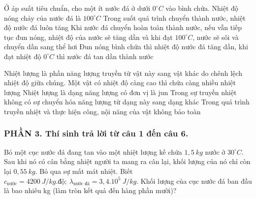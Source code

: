 \begin{ex}%
Ở áp suất tiêu chuẩn, cho một ít nước đá ở dưới $0^\circ C$ vào bình chứa.
\choiceTFt
{Nhiệt độ nóng chảy của nước đá là $100^\circ C$}
{Trong suốt quá trình chuyển thành nước, nhiệt độ nước đá luôn tăng}
{\True Khi nước đá chuyển hoàn toàn thành nước, nếu vẫn tiếp tục đun nóng, nhiệt
độ của nước sẽ tăng dần và khi đạt $100^\circ C$, nước sẽ sôi và chuyển dần sang thể hơi}
{\True Đun nóng bình chứa thì nhiệt độ nước đá tăng dần, khi đạt nhiệt độ $0^\circ C$ thì nước đá tan dần thành nước}
\loigiai{}
\end{ex}

\begin{ex}%
\loigiai{}
\end{ex}

\begin{ex}%
Nhiệt lượng là phần năng lượng truyền từ vật này sang vật khác do chênh lệch nhiệt độ giữa chúng.
\choiceTFt
{Một vật có nhiệt độ càng cao thì chứa càng nhiều nhiệt lượng}
{Nhiệt lượng là dạng năng lượng có đơn vị là jun}
{\True Trong sự truyền nhiệt không có sự chuyển hóa năng lượng từ dạng này sang dạng khác}
{\True Trong quá trình truyền nhiệt và thực hiện công, nội năng của vật không bảo toàn}
\loigiai{}
\end{ex}
\subsubsection*{PHẦN 3. Thí sinh trả lời từ câu 1 đến câu 6.}
\setcounter{ex}{0}
\begin{ex}%
Bỏ một cục nước đá đang tan vào một nhiệt lượng kế chứa $1,5\ kg$ nước ở $30^\circ C$. Sau khi nó có cân bằng nhiệt người ta mang ra cân lại, khối lượng của nó chỉ còn lại $0,55\ kg$. Bỏ qua sự mất mát nhiệt. Biết $c_{\text{nước}}=4200\ J/kg.\text{độ};\ \lambda_{\text{nước đá}}=3,4.10^5\ J/kg$. Khối lượng của cục nước đá ban đầu là bao nhiêu kg (làm tròn kết quả đến hàng phần mười)?
\loigiai{}
\end{ex}

